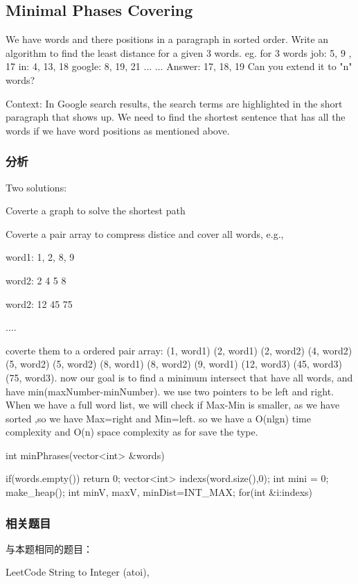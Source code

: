 \subsection{Minimal Phases Covering}

We have words and there positions in a paragraph in sorted order. Write an 
algorithm to find the least distance for a given 3 words. 
eg. for 3 words 
job: 5, 9 , 17 
in: 4, 13, 18 
google: 8, 19, 21 
... 
... 
Answer: 17, 18, 19 
Can you extend it to "n" words? 

Context: In Google search results, the search terms are highlighted in the 
short paragraph that shows up. We need to find the shortest sentence that has 
all the words if we have word positions as mentioned above.

\subsubsection{分析}
Two solutions:
\begindot
	\item Coverte a graph to solve the shortest path
	\item Coverte a pair array to compress distice and cover all words, e.g.,
	
	word1: 1, 2, 8, 9
	
	word2: 2 4 5 8
	
	word2: 12 45 75
	
	....
	
	coverte them to a ordered pair array: (1, word1) (2, word1) (2, word2) (4, word2) (5, word2) (5, word2) (8, word1) (8, word2) (9, word1) (12, word3) (45, word3) (75, word3).
	now our goal is to find a minimum intersect that have all words, and have min(maxNumber-minNumber).
	we use two pointers to be left and right. When we have a full word list, we will check if Max-Min is smaller, as we have sorted ,so we have Max=right and Min=left. so we have 
	a O(nlgn) time complexity and O(n) space complexity as for save the type.
	
\myenddot

\begin{Code}
	int minPhrases(vector<int> &words){
		if(words.empty()) return 0;
		vector<int> indexs(word.size(),0);
		int mini = 0;
		make_heap();
		int minV, maxV, minDist=INT_MAX;
		for(int &i:indexs){
			
		}
	}
\end{Code}

\subsubsection{相关题目}
与本题相同的题目：
\begindot
\item LeetCode String to Integer (atoi), 
\myenddot

